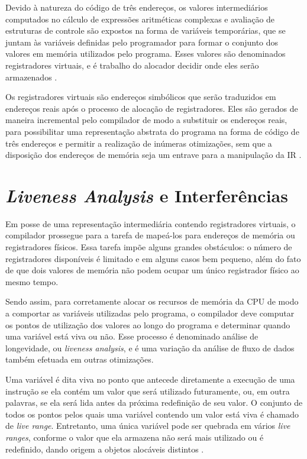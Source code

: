 \documentclass[
	12pt,				%
	openright,			%
	oneside,			%
	a4paper,			%
	tccpreliminar,			%
	]{ABNT-DC-UEL}
\begin{document}
Devido à natureza do código de três endereços, os valores intermediários computados no cálculo de expressões aritméticas complexas e avaliação de estruturas de controle são expostos na forma de variáveis temporárias, que se juntam às variáveis definidas pelo programador para formar o conjunto dos valores em memória utilizados pelo programa. Esses valores são denominados registradores virtuais, e é trabalho do alocador decidir onde eles serão armazenados \cite{muchnick:97}.

Os registradores virtuais são endereços simbólicos que serão traduzidos em endereços reais após o processo de alocação de registradores. Eles são gerados de maneira incremental pelo compilador de modo a substituir os endereços reais, para possibilitar uma representação abstrata do programa na forma de código de três endereços e permitir a realização de inúmeras otimizações, sem que a disposição dos endereços de memória seja um entrave para a manipulação da IR \cite{muchnick:97}.

\section{\textit{Liveness Analysis} e Interferências}

Em posse de uma representação intermediária contendo registradores virtuais, o compilador prossegue para a tarefa de mapeá-los para endereços de memória ou registradores físicos. Essa tarefa impõe alguns grandes obstáculos: o número de registradores disponíveis é limitado e em alguns casos bem pequeno, além do fato de que dois valores de memória não podem ocupar um único registrador físico ao mesmo tempo.

Sendo assim, para corretamente alocar os recursos de memória da CPU de modo a comportar as variáveis utilizadas pelo programa, o compilador deve computar os pontos de utilização dos valores ao longo do programa e determinar quando uma variável está viva ou não. Esse processo é denominado análise de longevidade, ou \textit{liveness analysis}, e é uma variação da análise de fluxo de dados também efetuada em outras otimizações. 

Uma variável é dita viva no ponto que antecede diretamente a execução de uma instrução se ela contém um valor que será utilizado futuramente, ou, em outra palavras, se ela será lida antes da próxima redefinição de seu valor. O conjunto de todos os pontos pelos quais uma variável contendo um valor está viva é chamado de \textit{live range}. Entretanto, uma única variável pode ser quebrada em vários \textit{live ranges}, conforme o valor que ela armazena não será mais utilizado ou é redefinido, dando origem a objetos alocáveis distintos \cite{aho:07}.
\end{document}
